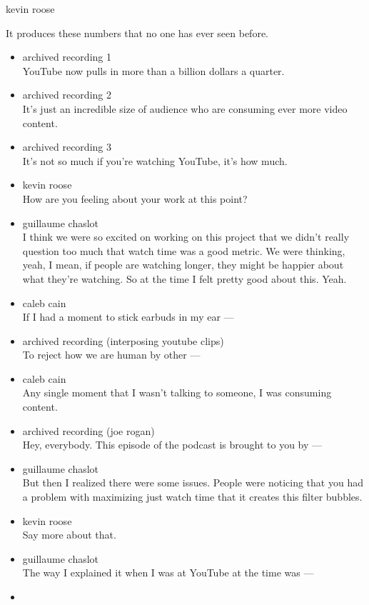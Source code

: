 kevin roose

It produces these numbers that no one has ever seen before.

\begin{itemize}
\item
  archived recording 1\\
  YouTube now pulls in more than a billion dollars a quarter.
\item
  archived recording 2\\
  It's just an incredible size of audience who are consuming ever more
  video content.
\item
  archived recording 3\\
  It's not so much if you're watching YouTube, it's how much.
\item
  kevin roose\\
  How are you feeling about your work at this point?
\item
  guillaume chaslot\\
  I think we were so excited on working on this project that we didn't
  really question too much that watch time was a good metric. We were
  thinking, yeah, I mean, if people are watching longer, they might be
  happier about what they're watching. So at the time I felt pretty good
  about this. Yeah.
\item
  caleb cain\\
  If I had a moment to stick earbuds in my ear ---
\item
  archived recording (interposing youtube clips)\\
  To reject how we are human by other ---
\item
  caleb cain\\
  Any single moment that I wasn't talking to someone, I was consuming
  content.
\item
  archived recording (joe rogan)\\
  Hey, everybody. This episode of the podcast is brought to you by ---
\item
  guillaume chaslot\\
  But then I realized there were some issues. People were noticing that
  you had a problem with maximizing just watch time that it creates this
  filter bubbles.
\item
  kevin roose\\
  Say more about that.
\item
  guillaume chaslot\\
  The way I explained it when I was at YouTube at the time was ---
\item

\end{itemize}
